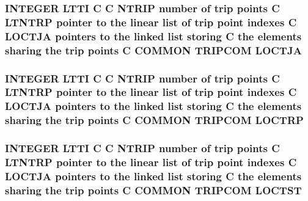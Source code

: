 \hypertarget{home_2abonfi_2_c_f_d__codes_2_eul_f_s_83_84_2include_2trip_8com_a6b0b8b0dad59abf485e0f27ae437ea82}{
\subsubsection[{L\-O\-C\-T\-J\-A}]{\setlength{\rightskip}{0pt plus 5cm}I\-N\-T\-E\-G\-E\-R L\-T\-T\-I C C {\bf N\-T\-R\-I\-P} number of trip points C L\-T\-N\-T\-R\-P pointer to the linear list of trip point indexes C L\-O\-C\-T\-J\-A pointers to the linked list storing C the elements sharing the trip points C C\-O\-M\-M\-O\-N T\-R\-I\-P\-C\-O\-M L\-O\-C\-T\-J\-A}}\label{home_2abonfi_2_c_f_d__codes_2_eul_f_s_83_84_2include_2trip_8com_a6b0b8b0dad59abf485e0f27ae437ea82}
\hypertarget{home_2abonfi_2_c_f_d__codes_2_eul_f_s_83_84_2include_2trip_8com_a7338c756eee0f214801ca3c7c3b5f6ee}{
\subsubsection[{L\-O\-C\-T\-R\-P}]{\setlength{\rightskip}{0pt plus 5cm}I\-N\-T\-E\-G\-E\-R L\-T\-T\-I C C {\bf N\-T\-R\-I\-P} number of trip points C L\-T\-N\-T\-R\-P pointer to the linear list of trip point indexes C {\bf L\-O\-C\-T\-J\-A} pointers to the linked list storing C the elements sharing the trip points C C\-O\-M\-M\-O\-N T\-R\-I\-P\-C\-O\-M L\-O\-C\-T\-R\-P}}\label{home_2abonfi_2_c_f_d__codes_2_eul_f_s_83_84_2include_2trip_8com_a7338c756eee0f214801ca3c7c3b5f6ee}
\hypertarget{home_2abonfi_2_c_f_d__codes_2_eul_f_s_83_84_2include_2trip_8com_a1da3a79d56d60efb2ec802079caef607}{
\subsubsection[{L\-O\-C\-T\-S\-T}]{\setlength{\rightskip}{0pt plus 5cm}I\-N\-T\-E\-G\-E\-R L\-T\-T\-I C C {\bf N\-T\-R\-I\-P} number of trip points C L\-T\-N\-T\-R\-P pointer to the linear list of trip point indexes C {\bf L\-O\-C\-T\-J\-A} pointers to the linked list storing C the elements sharing the trip points C C\-O\-M\-M\-O\-N T\-R\-I\-P\-C\-O\-M L\-O\-C\-T\-S\-T}}\label{home_2abonfi_2_c_f_d__codes_2_eul_f_s_83_84_2include_2trip_8com_a1da3a79d56d60efb2ec802079caef607}
